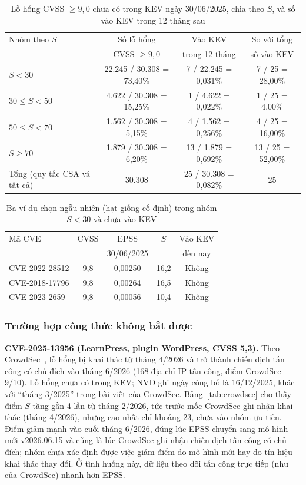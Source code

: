 \documentclass[conference]{IEEEtran}
\begin{document}
\begin{table}[t]
\centering
\caption{Lỗ hổng CVSS $\ge 9{,}0$ chưa có trong KEV ngày 30/06/2025, chia theo $S$, và số vào KEV trong 12 tháng sau}\label{tab:vathua}
\footnotesize
\begin{tabular}{lccc}
\toprule
Nhóm theo $S$ & Số lỗ hổng & Vào KEV & So với tổng \\
 & CVSS $\ge 9{,}0$ & trong 12 tháng & số vào KEV \\
\midrule
$S < 30$ & 22.245 / 30.308 = 73,40\% & 7 / 22.245 = 0,031\% & 7 / 25 = 28,00\% \\
$30 \le S < 50$ & 4.622 / 30.308 = 15,25\% & 1 / 4.622 = 0,022\% & 1 / 25 = 4,00\% \\
$50 \le S < 70$ & 1.562 / 30.308 = 5,15\% & 4 / 1.562 = 0,256\% & 4 / 25 = 16,00\% \\
$S \ge 70$ & 1.879 / 30.308 = 6,20\% & 13 / 1.879 = 0,692\% & 13 / 25 = 52,00\% \\
\midrule
Tổng (quy tắc CSA vá tất cả) & 30.308 & 25 / 30.308 = 0,082\% & 25 \\
\bottomrule
\end{tabular}
\end{table}

\begin{table}[t]
\centering
\caption{Ba ví dụ chọn ngẫu nhiên (hạt giống cố định) trong nhóm $S < 30$ và chưa vào KEV}\label{tab:ngaunhien}
\footnotesize
\begin{tabular}{lcccc}
\toprule
Mã CVE & CVSS & EPSS & $S$ & Vào KEV \\
 & & 30/06/2025 & & đến nay \\
\midrule
CVE-2022-28512 & 9,8 & 0,00250 & 16,2 & Không \\
CVE-2018-17796 & 9,8 & 0,00264 & 16,5 & Không \\
CVE-2023-2659 & 9,8 & 0,00056 & 10,4 & Không \\
\bottomrule
\end{tabular}
\end{table}

\subsubsection{Trường hợp công thức không bắt được}
\textbf{CVE-2025-13956 (LearnPress, plugin WordPress, CVSS 5,3).} Theo CrowdSec~\cite{crowdsec2026}, lỗ hổng bị khai thác từ tháng
4/2026 và trở thành chiến dịch tấn công có chủ đích vào tháng 6/2026 (168 địa chỉ IP tấn công, điểm CrowdSec
9/10). Lỗ hổng chưa có trong KEV; NVD ghi ngày công bố là 16/12/2025, khác với ``tháng 3/2025'' trong bài viết
của CrowdSec. Bảng~\ref{tab:crowdsec} cho thấy điểm $S$ tăng gần 4 lần từ tháng 2/2026, tức trước mốc CrowdSec ghi nhận khai thác (tháng 4/2026), nhưng cao nhất chỉ khoảng 23, chưa vào nhóm ưu tiên. Điểm giảm mạnh vào cuối tháng 6/2026, đúng lúc EPSS chuyển sang mô hình mới v2026.06.15 và cũng là lúc CrowdSec ghi nhận chiến dịch tấn công có chủ đích; nhóm chưa xác định được việc giảm điểm do mô hình mới hay do tín hiệu khai thác thay đổi. Ở tình huống này, dữ liệu theo dõi
tấn công trực tiếp (như của CrowdSec) nhanh hơn EPSS.
\end{document}
